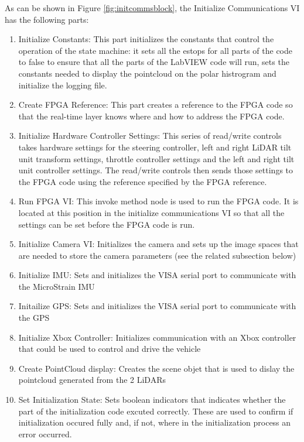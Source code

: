 \noindent As can be shown in Figure \ref{fig:initcommsblock}, the Initialize Communications VI has the following parts:

\begin{enumerate}
\item Initialize Constants: This part initializes the constants that control the operation of the state machine: it sets all the estops for all parts of the code to false to ensure that all the parts of the LabVIEW code will run, sets the constants needed to display the pointcloud on the polar histrogram and initialize the logging file.
\item Create FPGA Reference: This part creates a reference to the FPGA code so that the real-time layer knows where and how to address the FPGA code.
\item Initialize Hardware Controller Settings: This series of read/write controls takes hardware settings for the steering controller, left and right LiDAR tilt unit transform settings, throttle controller settings and the left and right tilt unit controller settings. The read/write controls then sends those settings to the FPGA code using the reference specified by the FPGA reference.
\item Run FPGA VI: This invoke method node is used to run the FPGA code. It is located at this position in the initialize communications VI so that all the settings can be set before the FPGA code is run.
\item Initialize Camera VI: Initializes the camera and sets up the image spaces that are needed to store the camera parameters (see the related subsection below)
\item Initialize IMU: Sets and initializes the VISA serial port to communicate with the MicroStrain IMU
\item Initailize GPS: Sets and initializes the VISA serial port to communicate with the GPS
\item Initialize Xbox Controller: Initializes communication with an Xbox controller that could be used to control and drive the vehicle
\item Create PointCloud display: Creates the scene objet that is used to dislay the pointcloud generated from the 2 LiDARs
\item Set Initialization State: Sets boolean indicators that indicates whether the part of the initialization code excuted correctly. These are used to confirm if initialization occured fully and, if not, where in the initialization process an error occurred.
\end{enumerate}

